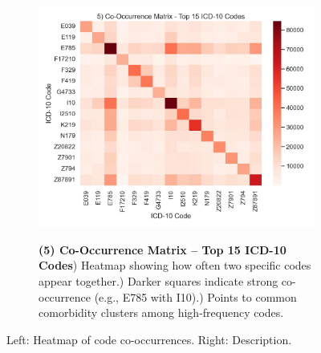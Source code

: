 \documentclass[12pt,a4paper]{report}
\begin{document}
\begin{figure}[ht!]
    \centering
    \begin{subfigure}{0.42\textwidth}
        \includegraphics[width=\linewidth]{mimic_plots/plot5.jpg}
    \end{subfigure}\hfill
    \begin{subfigure}{0.54\textwidth}
        \footnotesize
        \textbf{(5) Co-Occurrence Matrix -- Top 15 ICD-10 Codes}) Heatmap showing how often two specific codes appear together.) Darker squares indicate strong co-occurrence (e.g., E785 with I10).) Points to common comorbidity clusters among high-frequency codes.
    \end{subfigure}
    \caption{Left: Heatmap of code co-occurrences. Right: Description.}
    \label{fig:plot5}
\end{figure}
\end{document}
